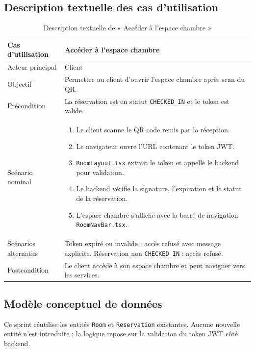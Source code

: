 \subsection{Description textuelle des cas d'utilisation}
\begin{table}[H]
\centering
\caption{Description textuelle de « Accéder à l'espace chambre »}
\small
\begin{tabularx}{\textwidth}{|p{3.5cm}|X|}
\hline
Cas d'utilisation & Accéder à l'espace chambre \\ \hline
Acteur principal & Client \\ \hline
Objectif & Permettre au client d'ouvrir l'espace chambre après scan du QR. \\ \hline
Précondition & La réservation est en statut \texttt{CHECKED\_IN} et le token est valide. \\ \hline
Scénario nominal &
\begin{enumerate}[nosep]
\item Le client scanne le QR code remis par la réception.
\item Le navigateur ouvre l'URL contenant le token JWT.
\item \texttt{RoomLayout.tsx} extrait le token et appelle le backend pour validation.
\item Le backend vérifie la signature, l'expiration et le statut de la réservation.
\item L'espace chambre s'affiche avec la barre de navigation \texttt{RoomNavBar.tsx}.
\end{enumerate} \\ \hline
Scénarios alternatifs & Token expiré ou invalide : accès refusé avec message explicite. Réservation non \texttt{CHECKED\_IN} : accès refusé. \\ \hline
Postcondition & Le client accède à son espace chambre et peut naviguer vers les services. \\ \hline
\end{tabularx}
\end{table}

\subsection{Modèle conceptuel de données}
Ce sprint réutilise les entités \texttt{Room} et \texttt{Reservation} existantes. Aucune nouvelle entité n'est introduite ; la logique repose sur la validation du token JWT côté backend.



